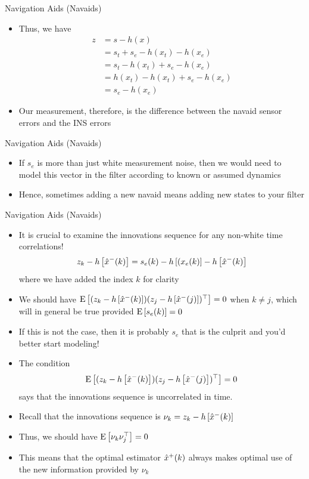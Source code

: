 \begin{frame}
Navigation Aids (Navaids)
\begin{itemize}
  \item Thus, we have
\begin{align*}
z&=s-h(x)\\
&=s_t + s_e - h(x_t) - h(x_e)\\
&=s_t - h(x_t) + s_e - h(x_e)\\
&=h(x_t) - h(x_t)+ s_e - h(x_e)\\
&=s_e - h(x_e)
\end{align*}
  \item Our measurement, therefore, is the difference between the navaid sensor errors and the INS errors
\end{itemize} 
\end{frame}

\begin{frame}
Navigation Aids (Navaids)
\begin{itemize}
  \item If $s_e$ is more than just white measurement noise, then we would need to model this vector in the filter according to known or assumed dynamics 
  \item Hence, sometimes adding a new navaid means adding new states to your filter

\end{itemize} 
\end{frame}

\begin{frame}
Navigation Aids (Navaids)
\begin{itemize}
  \item It is crucial to examine the innovations sequence for any non-white time correlations!
\[z_k-h\left[\stateest{k}{-}\right]=s_e(k)-h\left[(x_e(k)\right]-h\left[\stateest{k}{-}\right]\]
where we have added the index $k$ for clarity
 \item We should have $\expect{(z_k-h\left[\stateest{k}{-}\right])(z_j-h\left[\stateest{j}{-}\right])\trans}=0$ when $k\neq j$, which will in general be true provided $\expect{s_e(k)}=0$
 \item If this is not the case, then it is probably $s_e$ that is the culprit and you'd better start modeling!
\end{itemize} 
\end{frame}

\begin{frame}

\begin{itemize}
  \item The condition
\[\expect{(z_k-h\left[\stateest{k}{-}\right])(z_j-h\left[\stateest{j}{-}\right])\trans}=0
\]
says that the innovations sequence is uncorrelated in time.
  \item Recall that the innovations sequence is $\nu_k=z_k-h\left[\stateest{k}{-}\right]$
  \item Thus, we should have $\expect{\nu_k \nu_j\trans}=0$
  \item This means that the optimal estimator $\stateest{k}{+}$ always makes optimal use of the new information provided by $\nu_k$
\end{itemize} 
\end{frame}







%

%
